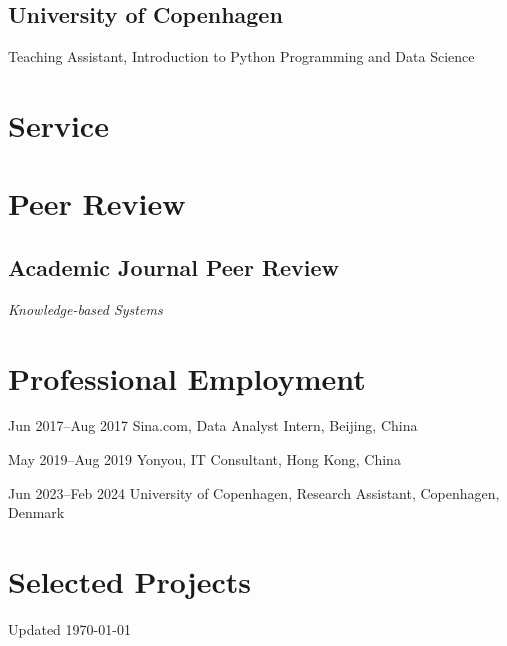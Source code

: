 \documentclass[11pt,letterpaper]{report}
\newcommand{\listitemspace}{0.25em}
\renewenvironment{itemize}
{\begin{list}{}{\setlength{\leftmargin}{0em}
                \setlength{\parskip}{0em}
                \setlength{\itemsep}{\listitemspace}
                \setlength{\parsep}{\listitemspace}}}
{\end{list}}
\begin{document}
    \subsection*{University of Copenhagen}

    \begin{itemize}

        \item Teaching Assistant, Introduction to Python Programming and Data Science

    \end{itemize}


    \section*{Service}

    \section*{Peer Review}

    \subsection*{Academic Journal Peer Review}

    \begin{itemize}

        \item \textit{Knowledge-based Systems}

    \end{itemize}


    \section*{Professional Employment}

    \begin{tablist}

        \item[Jun 2017--Aug 2017] \tab{}Sina.com, Data Analyst Intern, Beijing, China
        \item[May 2019--Aug 2019] \tab{}Yonyou, IT Consultant, Hong Kong, China
        \item[Jun 2023--Feb 2024] \tab{}University of Copenhagen, Research Assistant, Copenhagen, Denmark
        
    \end{tablist}

    \section*{Selected Projects}



    \begin{center}
        \vfill
        Updated \monthyeardate\today
    \end{center}
\end{document}
